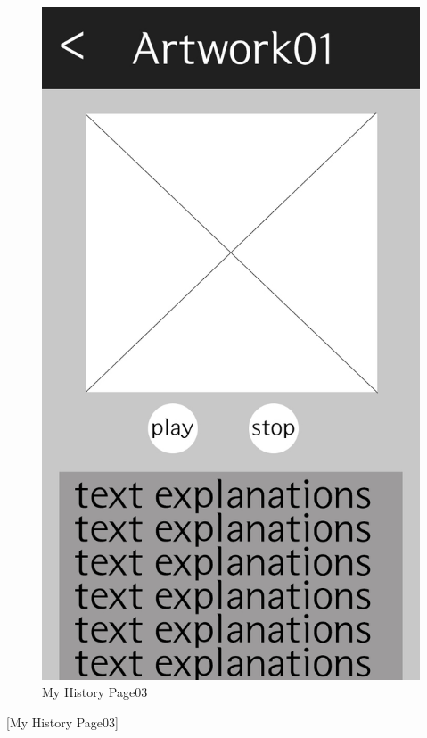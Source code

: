 \documentclass[conference]{IEEEtran}
\begin{document}
\begin{figure}[htbp]
\begin{center}
    \includegraphics[scale=0.2]{img_exhiDetail02}
    \caption{My History Page03} 
\end{center}
\end{figure}

[My History Page03]
\end{document}

